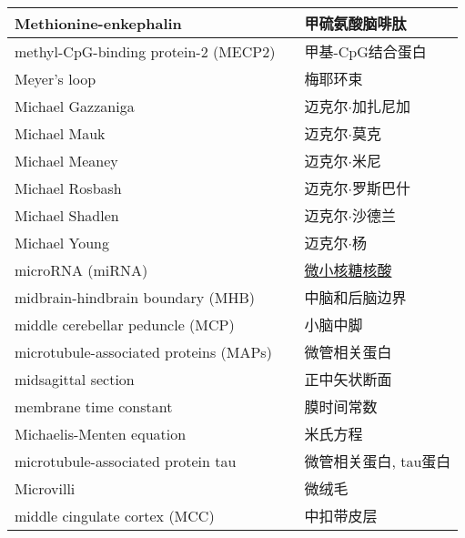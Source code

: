 \begin{longtable}{lll}
	\midrule
	Methionine-enkephalin   && 甲硫氨酸脑啡肽  \\
	
	\midrule
	methyl-CpG-binding protein-2 (MECP2)  && 甲基-CpG结合蛋白  \\
	
	\midrule
	Meyer's loop  && 梅耶环束 \\
	
	\midrule
	Michael Gazzaniga   && 迈克尔$\cdot$加扎尼加  \\
	
	\midrule
	Michael Mauk   && 迈克尔$\cdot$莫克  \\
	
	\midrule
	Michael Meaney   && 迈克尔$\cdot$米尼  \\
	
	\midrule
	Michael Rosbash   && 迈克尔$\cdot$罗斯巴什  \\
	
	\midrule
	Michael Shadlen   && 迈克尔$\cdot$沙德兰  \\
	
	\midrule
	Michael Young   && 迈克尔$\cdot$杨  \\
	
	\midrule
	microRNA (miRNA)   && \href{https://baike.baidu.com/item/micro\%20RNA/3683223}{微小核糖核酸}  \\
	
	\midrule
	midbrain-hindbrain boundary (MHB) && 中脑和后脑边界  \\
	
	\midrule
	middle cerebellar peduncle (MCP)  && 小脑中脚  \\
	
	\midrule
	microtubule-associated proteins (MAPs)  && 微管相关蛋白  \\
	
	\midrule
	midsagittal section  && 正中矢状断面  \\
	
	\midrule
	membrane time constant   && 膜时间常数  \\
	
	\midrule
	Michaelis-Menten equation   && 米氏方程  \\
	
	\midrule
	microtubule-associated protein tau    && 微管相关蛋白, tau蛋白  \\
	
	\midrule
	Microvilli    && 微绒毛  \\
	
	\midrule
	middle cingulate cortex (MCC)   && 中扣带皮层  \\
	

\end{longtable}

